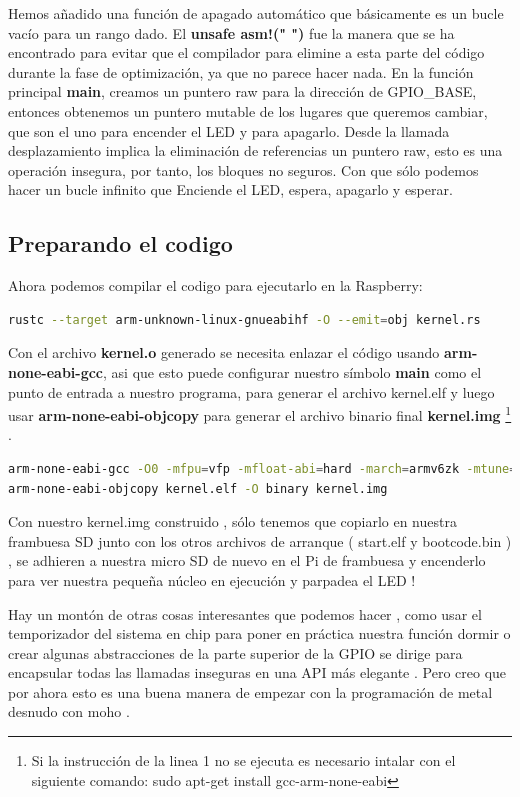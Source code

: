 \documentclass[12pt, twoside]{report}
\begin{document}
Hemos añadido una función de apagado automático que básicamente es un bucle vacío para un rango dado. El \textbf{unsafe { asm!(" ")}} fue la manera que se ha encontrado para evitar que el compilador para elimine a esta parte del código durante la fase de optimización, ya que no parece hacer nada. En la función principal \textbf{main}, creamos un puntero raw para la dirección de GPIO\_BASE, entonces obtenemos un puntero mutable de los lugares que queremos cambiar, que son el uno para encender el LED y para apagarlo. Desde la llamada desplazamiento implica la eliminación de referencias un puntero raw, esto es una operación insegura, por tanto, los bloques no seguros. Con que sólo podemos hacer un bucle infinito que Enciende el LED, espera, apagarlo y esperar.

\subsection{Preparando el codigo }

Ahora podemos compilar el codigo para ejecutarlo en la Raspberry:

\begin{lstlisting}[language=bash]
rustc --target arm-unknown-linux-gnueabihf -O --emit=obj kernel.rs
\end{lstlisting}

Con el archivo \textbf{kernel.o} generado se necesita enlazar el código usando \textbf{arm-none-eabi-gcc},  asi que esto puede configurar nuestro símbolo \textbf{main} como el punto de  entrada a nuestro programa, para generar el archivo kernel.elf y luego usar \textbf{arm-none-eabi-objcopy} para generar el archivo binario final \textbf{kernel.img} \footnote{Si la instrucción de la linea 1 no se ejecuta es necesario intalar con el siguiente comando: sudo apt-get install gcc-arm-none-eabi} .
\begin{lstlisting}[language=bash]
arm-none-eabi-gcc -O0 -mfpu=vfp -mfloat-abi=hard -march=armv6zk -mtune=arm1176jzf-s -nostartfiles  --specs=rdimon.specs -lgcc -lc -lm -lrdimon  kernel.o -o kernel.elf
arm-none-eabi-objcopy kernel.elf -O binary kernel.img
\end{lstlisting}
Con nuestro kernel.img construido , sólo tenemos que copiarlo en nuestra frambuesa SD junto con los otros archivos de arranque ( start.elf y bootcode.bin ) , se adhieren a nuestra micro SD de nuevo en el Pi de frambuesa y encenderlo para ver nuestra pequeña núcleo en ejecución y parpadea el LED !

Hay un montón de otras cosas interesantes que podemos hacer , como usar el temporizador del sistema en chip para poner en práctica nuestra función dormir o crear algunas abstracciones de la parte superior de la GPIO se dirige para encapsular todas las llamadas inseguras en una API más elegante . Pero creo que por ahora esto es una buena manera de empezar con la programación de metal desnudo con moho .
\end{document}
